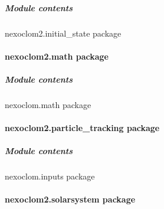 \documentclass[letterpaper,10pt,english]{sphinxmanual}
\begin{document}
\subparagraph{Module contents}
\label{\detokenize{apidocs/nexoclom2.initial_state:module-nexoclom2.initial_state}}\label{\detokenize{apidocs/nexoclom2.initial_state:module-contents}}
\sphinxAtStartPar
nexoclom2.initial\_state package

\sphinxstepscope


\paragraph{nexoclom2.math package}
\label{\detokenize{apidocs/nexoclom2.math:nexoclom2-math-package}}\label{\detokenize{apidocs/nexoclom2.math::doc}}

\subparagraph{Module contents}
\label{\detokenize{apidocs/nexoclom2.math:module-nexoclom2.math}}\label{\detokenize{apidocs/nexoclom2.math:module-contents}}
\sphinxAtStartPar
nexoclom.math package

\sphinxstepscope


\paragraph{nexoclom2.particle\_tracking package}
\label{\detokenize{apidocs/nexoclom2.particle_tracking:nexoclom2-particle-tracking-package}}\label{\detokenize{apidocs/nexoclom2.particle_tracking::doc}}

\subparagraph{Module contents}
\label{\detokenize{apidocs/nexoclom2.particle_tracking:module-nexoclom2.particle_tracking}}\label{\detokenize{apidocs/nexoclom2.particle_tracking:module-contents}}
\sphinxAtStartPar
nexoclom.inputs package

\sphinxstepscope


\paragraph{nexoclom2.solarsystem package}
\label{\detokenize{apidocs/nexoclom2.solarsystem:nexoclom2-solarsystem-package}}\label{\detokenize{apidocs/nexoclom2.solarsystem::doc}}
\end{document}
